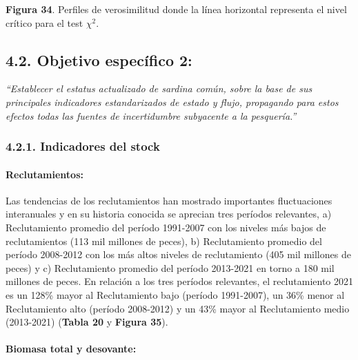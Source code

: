 \documentclass[
  spanish,
]{article}
\begin{document}
\vspace{-0.5cm}
\small

\textbf{Figura 34}. Perfiles de verosimilitud donde la línea horizontal
representa el nivel crítico para el test \(\chi^2\). \vspace{0.5cm}
\normalsize

\pagebreak

\hypertarget{objetivo-especuxedfico-2-1}{%
\subsection{4.2. Objetivo específico
2:}\label{objetivo-especuxedfico-2-1}}

\vspace{-0.2cm}

\emph{``Establecer el estatus actualizado de sardina común, sobre la
base de sus principales indicadores estandarizados de estado y flujo,
propagando para estos efectos todas las fuentes de incertidumbre
subyacente a la pesquería.''}

\hypertarget{indicadores-del-stock}{%
\subsubsection{4.2.1. Indicadores del
stock}\label{indicadores-del-stock}}

\hypertarget{reclutamientos}{%
\paragraph{Reclutamientos:}\label{reclutamientos}}

Las tendencias de los reclutamientos han mostrado importantes
fluctuaciones interanuales y en su historia conocida se aprecian tres
períodos relevantes, a) Reclutamiento promedio del período 1991-2007 con
los niveles más bajos de reclutamientos (113 mil millones de peces), b)
Reclutamiento promedio del período 2008-2012 con los más altos niveles
de reclutamiento (405 mil millones de peces) y c) Reclutamiento promedio
del período 2013-2021 en torno a 180 mil millones de peces. En relación
a los tres períodos relevantes, el reclutamiento 2021 es un 128\% mayor
al Reclutamiento bajo (período 1991-2007), un 36\% menor al
Reclutamiento alto (período 2008-2012) y un 43\% mayor al Reclutamiento
medio (2013-2021) (\textbf{Tabla 20} y \textbf{Figura 35}).

\hypertarget{biomasa-total-y-desovante}{%
\paragraph{Biomasa total y desovante:}\label{biomasa-total-y-desovante}}
\end{document}
